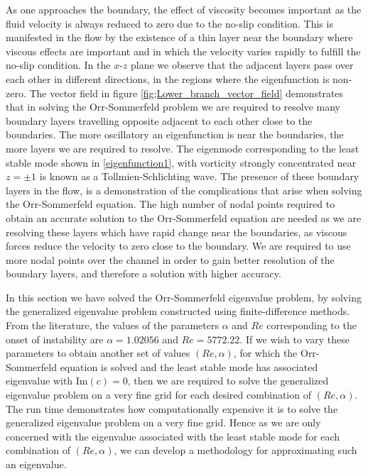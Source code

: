 \documentclass[a4paper, 12pt, twoside, openright]{article}
\numberwithin{equation}{section}
\begin{document}
As one approaches the boundary, the effect of viscosity becomes important as the fluid velocity is always reduced to zero due to the no-slip condition. This is manifested in the flow by the existence of a thin layer near the boundary where viscous effects are important and in which the velocity varies rapidly to fulfill the no-slip condition. In the $x$-$z$ plane we observe that the adjacent layers pass over each other in different directions, in the regions where the eigenfunction is non-zero. The vector field in figure \ref{fig;Lower_branch_vector_field} demonstrates that in solving the Orr-Sommerfeld problem we are required to resolve many boundary layers travelling opposite adjacent to each other close to the boundaries. The more oscillatory an eigenfunction is near the boundaries, the more layers we are required to resolve. The eigenmode corresponding to the least stable mode shown in \ref{eigenfunction1}, with vorticity strongly concentrated near $z=\pm1$ is known as a Tollmien-Schlichting wave. The presence of these boundary layers in the flow, is a demonstration of the complications that arise when solving the Orr-Sommerfeld equation. The high number of nodal points required to obtain an accurate solution to the Orr-Sommerfeld equation are needed as we are resolving these layers which have rapid change near the boundaries, as viscous forces reduce the velocity to zero close to the boundary. We are required to use more nodal points over the channel in order to gain better resolution of the boundary layers, and therefore a solution with higher accuracy. %

In this section we have solved the Orr-Sommerfeld eigenvalue problem, by solving the generalized eigenvalue problem constructed using finite-difference methods. From the literature, the values of the parameters $\alpha$ and $Re$ corresponding to the onset of instability are $\alpha=1.02056$ and $Re=5772.22$. If we wish to vary these parameters to obtain another set of values $(Re,\alpha)$, for which the Orr-Sommerfeld equation is solved and the least stable mode has associated eigenvalue with $\mathrm{Im}(c)=0$, then we are required to solve the generalized eigenvalue problem on a very fine grid for each desired combination of $(Re,\alpha)$. The run time demonstrates how computationally expensive it is to solve the generalized eigenvalue problem on a very fine grid. Hence as we are only concerned with the eigenvalue associated with the least stable mode for each combination of $(Re,\alpha)$, we can develop a methodology for approximating such an eigenvalue. 
\end{document}
